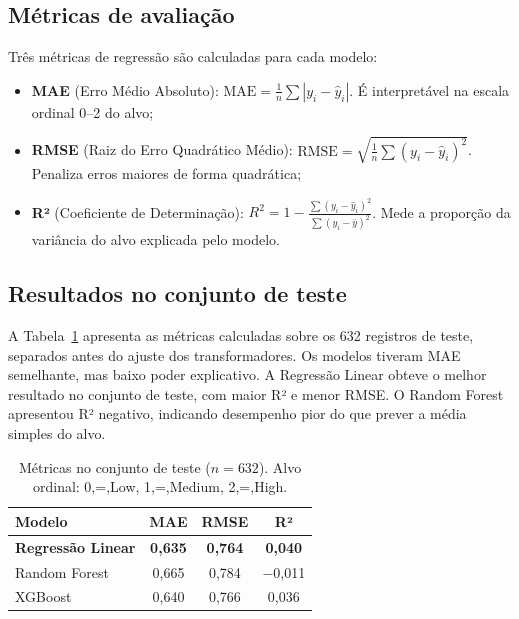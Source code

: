 \documentclass[conference]{IEEEtran}
\newcommand{\fonte}[1][elaborado pelos autores.]{%
\par\vspace{1pt}{\footnotesize\centering Fonte: #1\par}}
\begin{document}
\subsection{Métricas de avaliação}

Três métricas de regressão são calculadas para cada modelo:

\begin{itemize}
\item \textbf{MAE} (Erro Médio Absoluto):
$\text{MAE} = \frac{1}{n}\sum|y_i - \hat{y}_i|$.
É interpretável na escala ordinal 0--2 do alvo;
\item \textbf{RMSE} (Raiz do Erro Quadrático Médio):
$\text{RMSE} = \sqrt{\frac{1}{n}\sum(y_i-\hat{y}_i)^2}$.
Penaliza erros maiores de forma quadrática;
\item \textbf{R²} (Coeficiente de Determinação):
$R^2 = 1 - \frac{\sum(y_i-\hat{y}_i)^2}{\sum(y_i-\bar{y})^2}$.
Mede a proporção da variância do alvo explicada pelo modelo.
\end{itemize}

\subsection{Resultados no conjunto de teste}

A Tabela~\ref{tab:test} apresenta as métricas calculadas sobre os 632
registros de teste, separados antes do ajuste dos transformadores. Os
modelos tiveram MAE semelhante, mas baixo poder explicativo. A Regressão
Linear obteve o melhor resultado no conjunto de teste, com maior R² e menor
RMSE. O Random Forest apresentou R² negativo, indicando desempenho pior do
que prever a média simples do alvo.

\begin{table}[!t]
\centering
\small
\setlength{\tabcolsep}{4pt}
\caption{Métricas no conjunto de teste ($n = 632$). Alvo ordinal: 0,=,Low, 1,=,Medium, 2,=,High.}
\label{tab:test}
\begin{tabular}{lccc}
\toprule
\textbf{Modelo}           & \textbf{MAE}   & \textbf{RMSE}  & \textbf{R²}    \\
\midrule
\textbf{Regressão Linear} & \textbf{0,635} & \textbf{0,764} & \textbf{0,040} \\
Random Forest             & 0,665          & 0,784          & $-$0,011       \\
XGBoost                   & 0,640          & 0,766          & 0,036          \\
\bottomrule
\end{tabular}
\fonte
\end{table}
\end{document}
